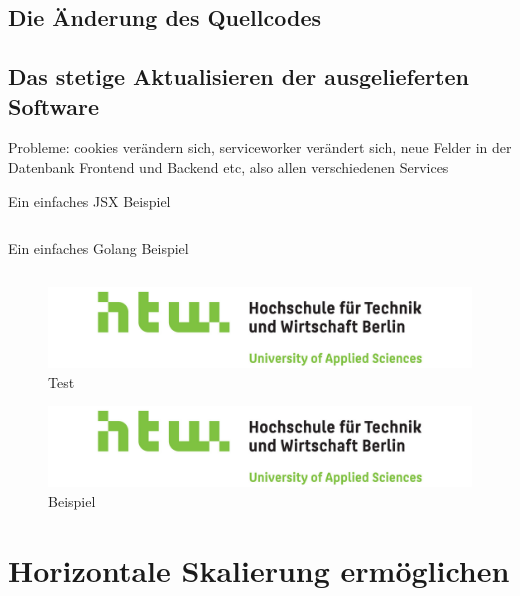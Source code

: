 \subsection{Die Änderung des Quellcodes}

\subsection{Das stetige Aktualisieren der ausgelieferten Software}
Probleme: cookies verändern sich, serviceworker verändert sich, neue Felder in der Datenbank
Frontend und Backend etc, also allen verschiedenen Services


\begin{listing}
    \label{lst:HelloJSX}
    \caption{Ein einfaches JSX Beispiel}
    \inputminted{jsx}{snippets/examples/Welcome.jsx}
\end{listing}

\begin{listing}
    \label{lst:Golang}
    \caption{Ein einfaches Golang Beispiel}
    \inputminted{go}{snippets/examples/hello.go}
\end{listing}

\newpage

\begin{figure}
    \label{figure:test}
    \includegraphics[scale=0.2]{img/HTW}
    \caption{Test}
\end{figure}

\begin{figure}
    \label{figure:beispiel}
    \includegraphics[scale=0.2]{img/HTW}
    \caption{Beispiel}
\end{figure}

\section{Horizontale Skalierung ermöglichen}

